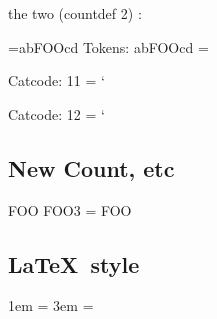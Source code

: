 \documentclass{article}
\begin{document}
the two (countdef 2) : \the\two


\def\foo{FOO}


={ab\foo cd}
Tokens: abFOOcd = \the{}

Catcode: 11 = \the\catcode`\A

Catcode: 12 = \the\catcode`\@


\subsection{New Count, etc}
\newcount\foo
\foo3 = \the\foo

\subsection{\LaTeX\ style}
\newlength{\foolen}
\setlength{\foolen}{1em}
1em = \the\foolen
\addtolength{\foolen}{2em}
3em = \the\foolen
\end{document}
